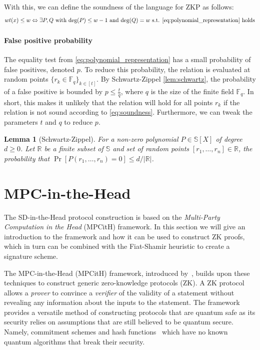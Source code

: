\documentclass[11pt]{report}
\theoremstyle{definition}
\theoremstyle{plain}
\newtheorem{lemma}{Lemma}[section]
\begin{document}
With this, we can define the soundness of the language for ZKP as follows:
\begin{equation}
  wt(x) \leq w \Leftrightarrow \exists P,Q \text{  with  }\text{deg}(P)\leq w-1\text{  and  }\text{deg}(Q) = w\text{ s.t. \autoref{eq:polynomial_representation} holds}\label{eq:soundness}
\end{equation}

\paragraph{False positive probability}\label{sub:equality_test}
The equality test from \autoref{eq:polynomial_representation} has a small probability of false positives, denoted $p$. To reduce this probability, the relation is evaluated at random points $\{r_k \in \mathbb{F}_q\}_{k\in[t]}$. By Schwartz-Zippel \autoref{lem:schwartz}, the probability of a false positive is bounded by $p \leq \frac{t}{q}$, where $q$ is the size of the finite field $\mathbb{F}_q$. In short, this makes it unlikely that the relation will hold for all points $r_k$ if the relation is not sound according to \autoref{eq:soundness}. Furthermore, we can tweak the parameters $t$ and $q$ to reduce $p$.

\begin{lemma}[Schwartz-Zippel]\label{lem:schwartz}
  For a non-zero polynomial $P \in \mathbb{S}[X]$ of degree $d \geq 0$. Let $\mathbb{R}$ be a finite subset of $\mathbb{S}$ and set of random points $[r_1, \dots, r_n] \in \mathbb{R}$, the probability that $\Pr[P(r_1, \dots, r_n) = 0] \leq d/|\mathbb{R}|$.
\end{lemma}

\section{MPC-in-the-Head}\label{sec:mpcinth}

The SD-in-the-Head protocol construction is based on the \textit{Multi-Party Computation in the Head} (MPCitH) framework. In this section we will give an introduction to the framework and how it can be used to construct ZK proofs, which in turn can be combined with the Fiat-Shamir heuristic to create a signature scheme.

The MPC-in-the-Head (MPCitH) framework, introduced by~\cite{ishai2007zero}, builds upon these techniques to construct generic zero-knowledge protocols (ZK). A ZK protocol allows a \textit{prover} to convince a \textit{verifier} of the validity of a statement without revealing any information about the inputs to the statement. The framework provides a versatile method of constructing protocols that are quantum safe as its security relies on assumptions that are still believed to be quantum secure. Namely, commitment schemes and hash functions~\cite{feneuil2023threshold} which have no known quantum algorithms that break their security.
\end{document}
